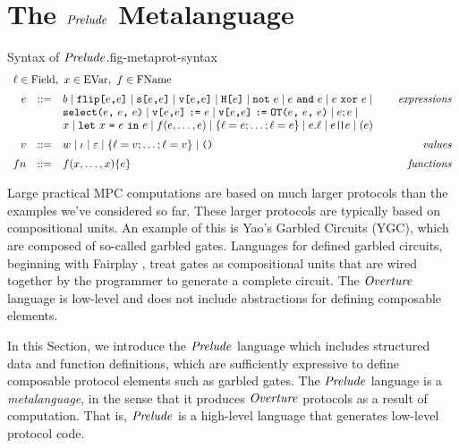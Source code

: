 \section{The $\mathit{Prelude}$ Metalanguage}
\label{section-metalang}

\begin{fpfig}[t]{Syntax of $\mathit{Prelude}$.}{fig-metaprot-syntax}
  {\small
    $$
    \begin{array}{rcl@{\hspace{8mm}}r}
      \multicolumn{3}{l}{\flab \in \mathrm{Field},\   x \in \mathrm{EVar}, \  f \in \mathrm{FName}}\\[2mm]
      e &::=& b \mid \flip{e}{e} \mid \secret{e}{e} \mid \view{e}{e} \mid \oracle{e} \mid \enot\ e \mid e\ \eand\ e \mid e\ \exor\ e \mid & \textit{expressions}\\[0mm]
      & & \select{e}{e}{e} \mid 
      \send{\view{e}{e}}{e} \mid \send{\view{e}{e}}{\OT{e}{e}{e}} \mid e;e \mid \\[0mm]
      & & x \mid \elet{x}{e}{e} \mid f(e,\ldots,e) \mid \{ \flab = e; \ldots; \flab = e \}
      \mid e.\flab \mid e\concat e \mid (e) \\[2mm]
      v &::=& w \mid \cid \mid \be \mid \{ \flab = v;\ldots;\flab = v \} 
      \mid \ttt{()} & \textit{values}\\[2mm]
           {fn} &::=& f(x,\ldots,x) \{ e \} & \textit{functions}
    \end{array}
    $$
  }
\end{fpfig}

Large practical MPC computations are based on much larger protocols
than the examples we've considered so far. These larger protocols are
typically based on compositional units. An example of this is Yao's
Garbled Circuits (YGC), which are composed of so-called garbled gates.
Languages for defined garbled circuits, beginning with Fairplay \cite{269581},
treat gates as compositional units that are wired together by the programmer
to generate a complete circuit. The $\mathit{Overture}$ language is low-level
and does not include abstractions for defining composable elements. 

In this Section, we introduce the $\mathit{Prelude}$ language which includes
structured data and function definitions, which are sufficiently
expressive to define composable protocol elements such as garbled
gates. The $\mathit{Prelude}$ language is a \emph{metalanguage}, in the sense
that it produces $\mathit{Overture}$ protocols as a result of computation. That
is, $\mathit{Prelude}$ is a high-level language that generates low-level
protocol code.

